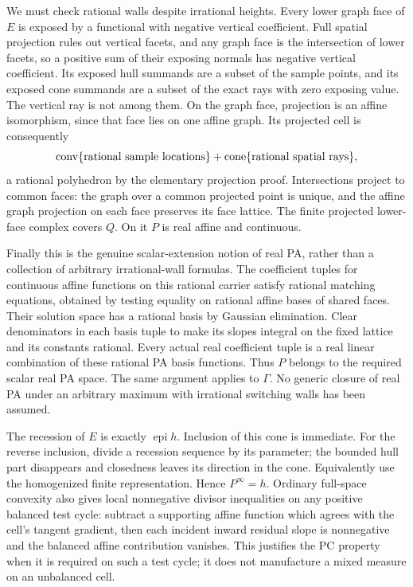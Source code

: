 \documentclass[
  11pt,
]{article}
\begin{document}
We must check rational walls despite irrational heights. Every lower
graph face of \(E\) is exposed by a functional with negative vertical
coefficient. Full spatial projection rules out vertical facets, and any
graph face is the intersection of lower facets, so a positive sum of
their exposing normals has negative vertical coefficient. Its exposed
hull summands are a subset of the sample points, and its exposed cone
summands are a subset of the exact rays with zero exposing value. The
vertical ray is not among them. On the graph face, projection is an
affine isomorphism, since that face lies on one affine graph. Its
projected cell is consequently
\[ \operatorname{conv}\{\hbox{rational sample locations}\}+\operatorname{cone}\{\hbox{rational spatial rays}\}, \]
a rational polyhedron by the elementary projection proof. Intersections
project to common faces: the graph over a common projected point is
unique, and the affine graph projection on each face preserves its face
lattice. The finite projected lower-face complex covers \(Q\). On it
\(P\) is real affine and continuous.

Finally this is the genuine scalar-extension notion of real PA, rather
than a collection of arbitrary irrational-wall formulas. The coefficient
tuples for continuous affine functions on this rational carrier satisfy
rational matching equations, obtained by testing equality on rational
affine bases of shared faces. Their solution space has a rational basis
by Gaussian elimination. Clear denominators in each basis tuple to make
its slopes integral on the fixed lattice and its constants rational.
Every actual real coefficient tuple is a real linear combination of
these rational PA basis functions. Thus \(P\) belongs to the required
scalar real PA space. The same argument applies to \(\Gamma\). No
generic closure of real PA under an arbitrary maximum with irrational
switching walls has been assumed.

The recession of \(E\) is exactly \(\operatorname{epi}h\). Inclusion of
this cone is immediate. For the reverse inclusion, divide a recession
sequence by its parameter; the bounded hull part disappears and
closedness leaves its direction in the cone. Equivalently use the
homogenized finite representation. Hence \(P^\infty=h\). Ordinary
full-space convexity also gives local nonnegative divisor inequalities
on any positive balanced test cycle: subtract a supporting affine
function which agrees with the cell's tangent gradient, then each
incident inward residual slope is nonnegative and the balanced affine
contribution vanishes. This justifies the PC property when it is
required on such a test cycle; it does not manufacture a mixed measure
on an unbalanced cell.
\end{document}
